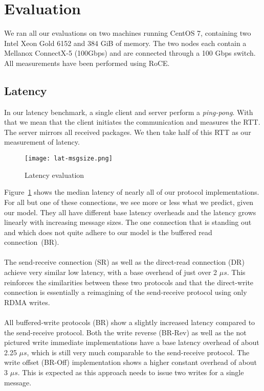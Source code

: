 \section{Evaluation}

We ran all our evaluations on two machines running CentOS 7, containing two Intel Xeon Gold 6152 and 384 GiB of memory.
The two nodes each contain a Mellanox ConnectX-5 (100Gbps) and are connected through a 100 Gbps switch. All measurements
have been performed using RoCE.

\subsection{Latency}

 In our latency benchmark, a single client and server perform a \emph{ping-pong}. With that 
we mean that the client initiates the communication and measures the RTT. The server mirrors all received packages. 
We then take half of this RTT as our measurement of latency.

\begin{figure}[h]
\texttt{[image: lat-msgsize.png]}
\caption{Latency evaluation}
\label{fig:plot-lat}
\end{figure}


Figure~\ref{fig:plot-lat} shows the median latency of nearly all of our protocol implementations. For all but one of these 
connections, we see more or less what we predict, given our model. They all have different base latency overheads
and the latency grows linearly with increasing message sizes. The one connection that is standing out
and which does not quite adhere to our model is the buffered read \mbox{connection (BR)}.

\paragraph{} The send-receive connection (SR) as well as the direct-read connection (DR) achieve very similar low latency,
with a base overhead of just over 2 $\mu s$. This reinforces the similarities between these two protocols and that the 
direct-write connection is essentially a reimagining of the send-receive protocol using only RDMA writes.



\paragraph{} All buffered-write protocols (BR) show a slightly increased latency compared to the send-receive protocol.
Both the write reverse (BR-Rev) as well as the not pictured write immediate implementations have a base latency overhead 
of about 2.25 $\mu s$, which is still very much comparable to the send-receive protocol. The write offset 
(BR-Off) implementation shows a higher constant overhead of about 3 $\mu s$. This is expected as this approach needs to 
issue two writes for a single message.


